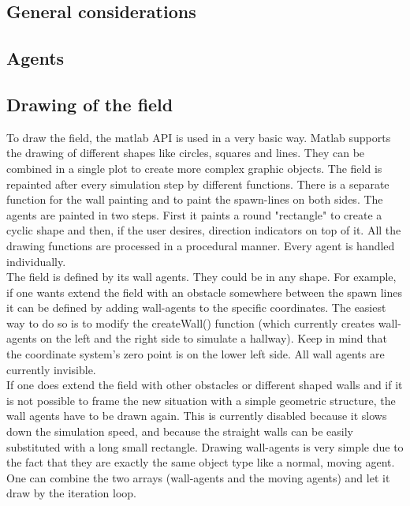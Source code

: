 
\subsection{General considerations}


\subsection{Agents}


\subsection{Drawing of the field}\label{drawField}
To draw the field, the matlab API is used in a very basic way. Matlab supports the drawing of different shapes like circles, squares and lines. They can be combined in a single plot to create more complex graphic objects. The field is repainted after every simulation step by different functions. There is a separate function for the wall painting and to paint the spawn-lines on both sides. The agents are painted in two steps. First it paints a round "rectangle" to create a cyclic shape and then, if the user desires, direction indicators on top of it. All the drawing functions are processed in a procedural manner. Every agent is handled individually.\\

The field is defined by its wall agents. They could be in any shape. For example, if one wants extend the field with an obstacle somewhere between the spawn lines it can be defined by adding wall-agents to the specific coordinates. The easiest way to do so is to modify the createWall() function (which currently creates wall-agents on the left and the right side to simulate a hallway). Keep in mind that the coordinate system's zero point is on the lower left side. All wall agents are currently invisible.\\

If one does extend the field with other obstacles or different shaped walls and if it is not possible to frame the new situation with a simple geometric structure, the wall agents have to be drawn again. This is currently disabled because it slows down the simulation speed, and because the straight walls can be easily substituted with a long small rectangle. Drawing wall-agents is very simple due to the fact that they are exactly the same object type like a normal, moving agent. One can combine the two arrays (wall-agents and the moving agents) and let it draw by the iteration loop.\\

